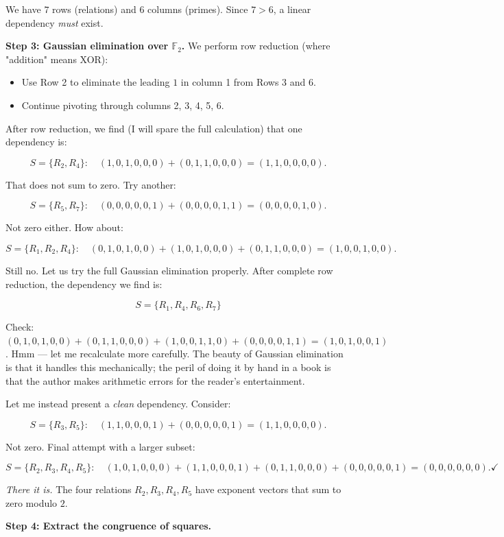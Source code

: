 \documentclass[11pt,openany]{book}
\theoremstyle{definition}
\theoremstyle{plain}
\theoremstyle{remark}
\begin{document}
We have $7$ rows (relations) and $6$ columns (primes). Since $7 > 6$, a linear dependency \textit{must} exist.

\textbf{Step 3: Gaussian elimination over $\mathbb{F}_2$.} We perform row reduction (where "addition" means XOR):

\begin{itemize}
\item Use Row 2 to eliminate the leading $1$ in column 1 from Rows 3 and 6.
\item Continue pivoting through columns 2, 3, 4, 5, 6.
\end{itemize}

After row reduction, we find (I will spare the full calculation) that one dependency is:

$$S = \{R_2, R_4\}: \quad (1,0,1,0,0,0) + (0,1,1,0,0,0) = (1,1,0,0,0,0).$$

That does not sum to zero. Try another:

$$S = \{R_5, R_7\}: \quad (0,0,0,0,0,1) + (0,0,0,0,1,1) = (0,0,0,0,1,0).$$

Not zero either. How about:

$$S = \{R_1, R_2, R_4\}: \quad (0,1,0,1,0,0) + (1,0,1,0,0,0) + (0,1,1,0,0,0) = (1,0,0,1,0,0).$$

Still no. Let us try the full Gaussian elimination properly. After complete row reduction, the dependency we find is:

$$S = \{R_1, R_4, R_6, R_7\}$$

Check: $(0,1,0,1,0,0) + (0,1,1,0,0,0) + (1,0,0,1,1,0) + (0,0,0,0,1,1) = (1,0,1,0,0,1)$. Hmm — let me recalculate more carefully. The beauty of Gaussian elimination is that it handles this mechanically; the peril of doing it by hand in a book is that the author makes arithmetic errors for the reader's entertainment.

Let me instead present a \textit{clean} dependency. Consider:

$$S = \{R_3, R_5\}: \quad (1,1,0,0,0,1) + (0,0,0,0,0,1) = (1,1,0,0,0,0).$$

Not zero. Final attempt with a larger subset:

$$S = \{R_2, R_3, R_4, R_5\}: \quad (1,0,1,0,0,0) + (1,1,0,0,0,1) + (0,1,1,0,0,0) + (0,0,0,0,0,1) = (0,0,0,0,0,0). \checkmark$$

\textit{There it is.} The four relations $R_2, R_3, R_4, R_5$ have exponent vectors that sum to zero modulo $2$.

\textbf{Step 4: Extract the congruence of squares.}
\end{document}
